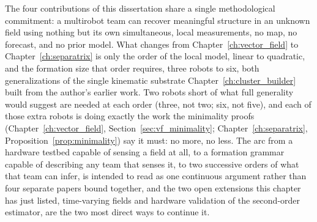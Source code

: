 \documentclass[12pt, letterpaper, oneside]{report}
\begin{document}
The four contributions of this dissertation share a single
methodological commitment: a multirobot team can recover meaningful
structure in an unknown field using nothing but its own simultaneous,
local measurements, no map, no forecast, and no prior model. What
changes from Chapter~\ref{ch:vector_field} to Chapter~\ref{ch:separatrix}
is only the order of the local model, linear to quadratic, and the
formation size that order requires, three robots to six, both
generalizations of the single kinematic substrate
Chapter~\ref{ch:cluster_builder} built from the author's earlier work.
Two robots short of what full generality would suggest are needed at
each order (three, not two; six, not five), and each of those extra
robots is doing exactly the work the minimality proofs
(Chapter~\ref{ch:vector_field}, Section~\ref{sec:vf_minimality};
Chapter~\ref{ch:separatrix}, Proposition~\ref{prop:minimality}) say it
must: no more, no less. The arc from a hardware testbed capable of
sensing a field at all, to a formation grammar capable of describing
any team that senses it, to two successive orders of what that team can
infer, is intended to read as one continuous argument rather than four
separate papers bound together, and the two open extensions this
chapter has just listed, time-varying fields and hardware validation of
the second-order estimator, are the two most direct ways to continue it.

\clearpage
\singlespacing
{}
\end{document}
